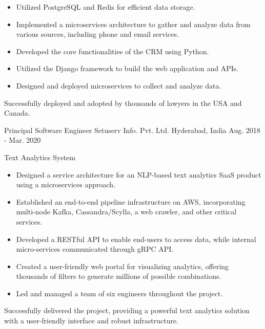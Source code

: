 \begin{cventries}
{\begin{cvitems}
\begin {itemize}
        \item Utilized PostgreSQL and Redis for efficient data storage.
        \item Implemented a microservices architecture to gather and analyze data from various sources, including phone and email services.
        \item Developed the core functionalities of the CRM using Python.
        \item Utilized the Django framework to build the web application and APIs.
        \item Designed and deployed microservices to collect and analyze data.
      \end{itemize}
        Successfully deployed and adopted by thousands of lawyers in the USA and Canada.
      \end{cvitems}
    }
  \cventry
    {Principal Software Engineer} %
    {Setuserv Info. Pvt. Ltd.} %
    {Hyderabad, India} %
    {Aug. 2018 - Mar. 2020} %
    {
      \begin{cvitems} %
        \item {Text Analytics System}
        \begin {itemize}
          \item Designed a service architecture for an NLP-based text analytics SaaS product using a microservices approach.
          \item Established an end-to-end pipeline infrastructure on AWS, incorporating multi-node Kafka, Cassandra/Scylla, a web crawler, and other critical services.
          \item Developed a RESTful API to enable end-users to access data, while internal micro-services communicated through gRPC API.
          \item Created a user-friendly web portal for visualizing analytics, offering thousands of filters to generate millions of possible combinations.
          \item Led and managed a team of six engineers throughout the project.
          \end{itemize}
        Successfully delivered the project, providing a powerful text analytics solution with a user-friendly interface and robust infrastructure.
        \end{cvitems}
    }


\end{cventries}
